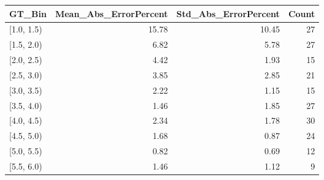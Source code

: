 \begin{tabular}{lrrr}
\toprule
GT_Bin & Mean_Abs_ErrorPercent & Std_Abs_ErrorPercent & Count \\
\midrule
[1.0, 1.5) & 15.78 & 10.45 & 27 \\
[1.5, 2.0) & 6.82 & 5.78 & 27 \\
[2.0, 2.5) & 4.42 & 1.93 & 15 \\
[2.5, 3.0) & 3.85 & 2.85 & 21 \\
[3.0, 3.5) & 2.22 & 1.15 & 15 \\
[3.5, 4.0) & 1.46 & 1.85 & 27 \\
[4.0, 4.5) & 2.34 & 1.78 & 30 \\
[4.5, 5.0) & 1.68 & 0.87 & 24 \\
[5.0, 5.5) & 0.82 & 0.69 & 12 \\
[5.5, 6.0) & 1.46 & 1.12 & 9 \\
\bottomrule
\end{tabular}
